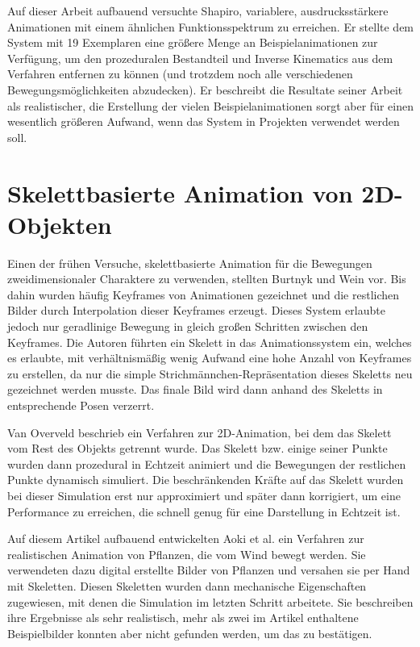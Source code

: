 Auf dieser Arbeit aufbauend versuchte Shapiro\cite{shapiro2011building}, variablere, ausdrucksstärkere Animationen mit einem ähnlichen Funktionsspektrum zu erreichen. Er stellte dem System mit 19 Exemplaren eine größere Menge an Beispielanimationen zur Verfügung, um den prozeduralen Bestandteil und Inverse Kinematics aus dem Verfahren entfernen zu können (und trotzdem noch alle verschiedenen Bewegungsmöglichkeiten abzudecken). Er beschreibt die Resultate seiner Arbeit als realistischer, die Erstellung der vielen Beispielanimationen sorgt aber für einen wesentlich größeren Aufwand, wenn das System in Projekten verwendet werden soll.

\section{Skelettbasierte Animation von 2D-Objekten}
Einen der frühen Versuche, skelettbasierte Animation für die Bewegungen zweidimensionaler Charaktere zu verwenden, stellten Burtnyk und Wein\cite{burtnyk1976interactive} vor. Bis dahin wurden häufig Keyframes von Animationen gezeichnet und die restlichen Bilder durch Interpolation dieser Keyframes erzeugt. Dieses System erlaubte jedoch nur geradlinige Bewegung in gleich großen Schritten zwischen den Keyframes. Die Autoren führten ein Skelett in das Animationssystem ein, welches es erlaubte, mit verhältnismäßig wenig Aufwand eine hohe Anzahl von Keyframes zu erstellen, da nur die simple Strichmännchen-Repräsentation dieses Skeletts neu gezeichnet werden musste. Das finale Bild wird dann anhand des Skeletts in entsprechende Posen verzerrt.

Van Overveld\cite{van1990technique} beschrieb ein Verfahren zur 2D-Animation, bei dem das Skelett vom Rest des Objekts getrennt wurde. Das Skelett bzw. einige seiner Punkte wurden dann prozedural in Echtzeit animiert und die Bewegungen der restlichen Punkte dynamisch simuliert. Die beschränkenden Kräfte auf das Skelett wurden bei dieser Simulation erst nur approximiert und später dann korrigiert, um eine Performance zu erreichen, die schnell genug für eine Darstellung in Echtzeit ist.

Auf diesem Artikel aufbauend entwickelten Aoki et al.\cite{aoki1999dynamic} ein Verfahren zur realistischen Animation von Pflanzen, die vom Wind bewegt werden. Sie verwendeten dazu digital erstellte Bilder von Pflanzen und versahen sie per Hand mit Skeletten. Diesen Skeletten wurden dann mechanische Eigenschaften zugewiesen, mit denen die Simulation im letzten Schritt arbeitete. Sie beschreiben ihre Ergebnisse als sehr realistisch, mehr als zwei im Artikel enthaltene Beispielbilder konnten aber nicht gefunden werden, um das zu bestätigen.

